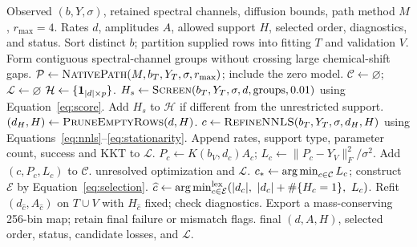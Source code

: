 \begin{algorithm}[H]
\caption{Automatic spectral-support selection for RAI-S and DOME-S}\label{alg:support}
\begin{algorithmic}[1]
\Require Observed $(b,Y,\sigma)$, retained spectral channels, diffusion bounds, path method $M$, $r_{\max}=4$.
\Ensure Rates $d$, amplitudes $A$, allowed support $H$, selected order, diagnostics, and status.
\State Sort distinct $b$; partition supplied rows into fitting $T$ and validation $V$.
\State Form contiguous spectral-channel groups without crossing large chemical-shift gaps.
\State $\mathcal P\gets\Call{NativePath}{M,b_T,Y_T,\sigma,r_{\max}}$; include the zero model.
\State $\mathcal C\gets\varnothing$; $\mathcal L\gets\varnothing$ 
  \State $\mathcal H\gets\{\mathbf{1}_{|d|\times p}\}$.
    \State $H_s\gets\Call{Screen}{b_T,Y_T,\sigma,d,\text{groups},0.01}$ using Equation~\eqref{eq:score}.
    \State Add $H_s$ to $\mathcal H$ if different from the unrestricted support.
  \EndIf
    \State $ (d_H,H)\gets\Call{PruneEmptyRows}{d,H}$.
    \State $c\gets\Call{RefineNNLS}{b_T,Y_T,\sigma,d_H,H}$ using Equations~\eqref{eq:nnls}--\eqref{eq:stationarity}.
    \State Append rates, support type, parameter count, success and KKT to $\mathcal L$.
      \State $P_c\gets K(b_V,d_c)A_c$; $L_c\gets\|P_c-Y_V\|_F^2/\sigma^2$.
      \State Add $(c,P_c,L_c)$ to $\mathcal C$.
    \EndIf
  \EndFor
\EndFor
{}
  \State \Return unresolved optimization and $\mathcal L$.
\EndIf
\State $c_*\gets\operatorname*{arg\,min}_{c\in\mathcal C}L_c$; construct $\mathcal E$ by Equation~\eqref{eq:selection}.
\State $\widehat c\gets\operatorname*{arg\,min}_{c\in\mathcal E}^{\rm lex}(|d_c|,\ |d_c|+\#\{H_c=1\},\ L_c)$.
\State Refit $(d_{\widehat c},A_{\widehat c})$ on $T\cup V$ with $H_{\widehat c}$ fixed; check diagnostics.
\State Export a mass-conserving 256-bin map; retain final failure or mismatch flags.
\State \Return final $(d,A,H)$, selected order, status, candidate losses, and $\mathcal L$.
\end{algorithmic}
\end{algorithm}
